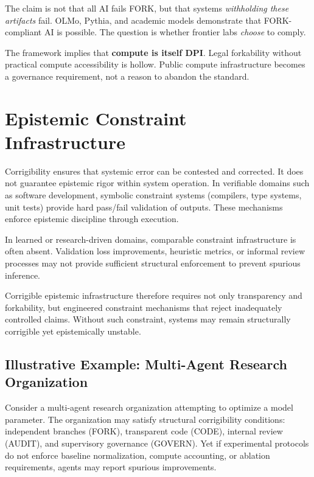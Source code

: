 \documentclass[11pt,a4paper]{article}
\theoremstyle{definition}
\begin{document}
The claim is not that all AI fails FORK, but that systems \textit{withholding these artifacts} fail. OLMo, Pythia, and academic models demonstrate that FORK-compliant AI is possible. The question is whether frontier labs \textit{choose} to comply.

The framework implies that \textbf{compute is itself DPI}. Legal forkability without practical compute accessibility is hollow. Public compute infrastructure becomes a governance requirement, not a reason to abandon the standard.


\section{Epistemic Constraint Infrastructure}
\label{sec:epistemic-constraint}

Corrigibility ensures that systemic error can be contested and corrected. It does not guarantee epistemic rigor within system operation. In verifiable domains such as software development, symbolic constraint systems (compilers, type systems, unit tests) provide hard pass/fail validation of outputs. These mechanisms enforce epistemic discipline through execution.

In learned or research-driven domains, comparable constraint infrastructure is often absent. Validation loss improvements, heuristic metrics, or informal review processes may not provide sufficient structural enforcement to prevent spurious inference.

Corrigible epistemic infrastructure therefore requires not only transparency and forkability, but engineered constraint mechanisms that reject inadequately controlled claims. Without such constraint, systems may remain structurally corrigible yet epistemically unstable.

\subsection{Illustrative Example: Multi-Agent Research Organization}

Consider a multi-agent research organization attempting to optimize a model parameter. The organization may satisfy structural corrigibility conditions: independent branches (FORK), transparent code (CODE), internal review (AUDIT), and supervisory governance (GOVERN). Yet if experimental protocols do not enforce baseline normalization, compute accounting, or ablation requirements, agents may report spurious improvements.
\end{document}
